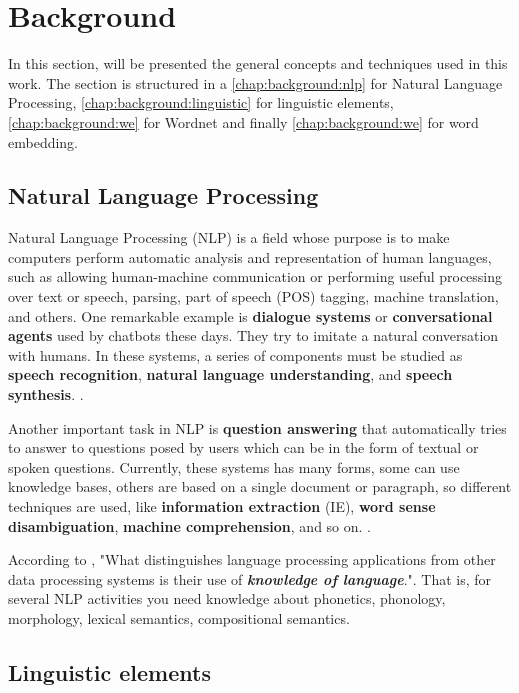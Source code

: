\section{Background}\label{chap:background}

In this section, will be presented the general concepts and techniques used in this work. The section is structured in a \autoref{chap:background:nlp} for Natural Language Processing, \autoref{chap:background:linguistic} for linguistic elements, \autoref{chap:background:we} for Wordnet and finally \autoref{chap:background:we} for word embedding.

\subsection{Natural Language Processing}\label{chap:background:nlp}

Natural Language Processing (NLP) is a field whose purpose is to make computers perform automatic analysis and representation of human languages, such as allowing human-machine communication or performing useful processing over text or speech, parsing, part of speech (POS) tagging, machine translation, and others. One remarkable example is \textbf{dialogue systems} or \textbf{conversational agents} used by chatbots these days. They try to imitate a natural conversation with humans. In these systems, a series of components must be studied as \textbf{speech recognition}, \textbf{natural language understanding}, and \textbf{speech synthesis}. \cite{DBLP:journals/corr/abs-1708-02709,Jurafsky:2009:SLP:1214993}.

Another important task in NLP is \textbf{question answering} that automatically tries to answer to questions posed by users which can be in the form of textual or spoken questions. Currently, these systems has many forms, some can use knowledge bases, others are based on a single document or paragraph, so different techniques are used, like \textbf{information extraction} (IE), \textbf{word sense disambiguation}, \textbf{machine comprehension}, and so on. \cite{DBLP:journals/corr/abs-1708-02709}.

According to , "What distinguishes language processing applications from other data processing systems is their use of \textit{\textbf{knowledge of language}}.". That is, for several NLP activities you need knowledge about phonetics, phonology, morphology, lexical semantics, compositional semantics.

\subsection{Linguistic elements}\label{chap:background:linguistic}

